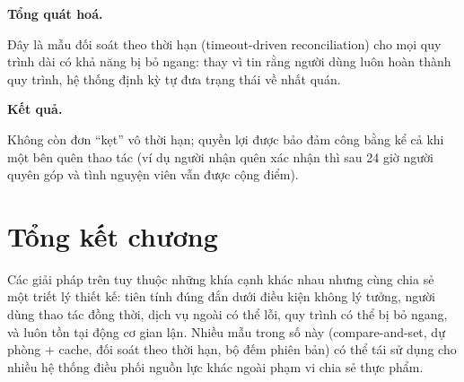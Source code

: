 \documentclass[../main.tex]{subfiles}%
\begin{document}
\textbf{Tổng quát hoá.} 

Đây là mẫu đối soát theo thời hạn (timeout-driven reconciliation) cho mọi quy trình dài có khả năng bị bỏ ngang: thay vì tin rằng người dùng luôn hoàn thành quy trình, hệ thống định kỳ tự đưa trạng thái về nhất quán.

\textbf{Kết quả.} 

Không còn đơn ``kẹt'' vô thời hạn; quyền lợi được bảo đảm công bằng kể cả khi một bên quên thao tác (ví dụ người nhận quên xác nhận thì sau 24 giờ người quyên góp và tình nguyện viên vẫn được cộng điểm).

\section{Tổng kết chương}
\label{section:5.7}

Các giải pháp trên tuy thuộc những khía cạnh khác nhau nhưng cùng chia sẻ một triết lý thiết kế:  tiên tính đúng đắn dưới điều kiện không lý tưởng, người dùng thao tác đồng thời, dịch vụ ngoài có thể lỗi, quy trình có thể bị bỏ ngang, và luôn tồn tại động cơ gian lận. Nhiều mẫu trong số này (compare-and-set, dự phòng + cache, đối soát theo thời hạn, bộ đếm phiên bản) có thể tái sử dụng cho nhiều hệ thống điều phối nguồn lực khác ngoài phạm vi chia sẻ thực phẩm.

\ifSubfilesClassLoaded{\printbibliography{}}{}
\end{document}

